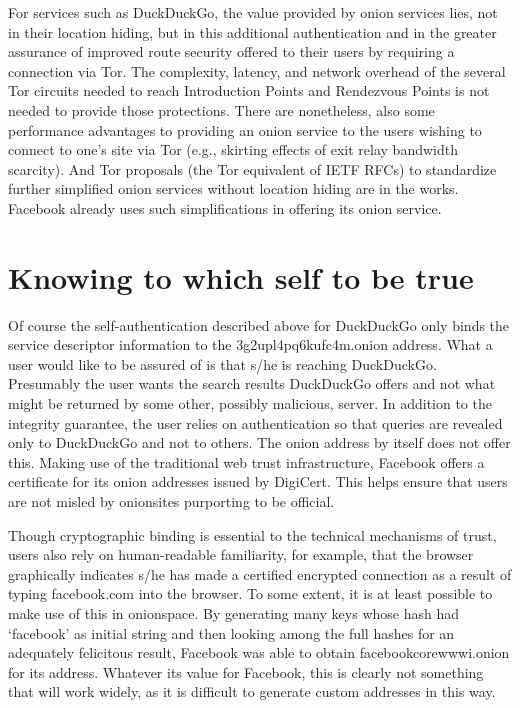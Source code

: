 \documentclass[10pt]{styles/IEEEtran}
\begin{document}
For services such as DuckDuckGo, the value provided by onion services
lies, not in their location hiding, but in this additional
authentication and in the greater assurance of improved route security
offered to their users by requiring a connection via Tor. The
complexity, latency, and network overhead of the several Tor circuits
needed to reach Introduction Points and Rendezvous Points is not
needed to provide those protections. There are nonetheless, also some
performance advantages to providing an onion service to the users
wishing to connect to one's site via Tor (e.g., skirting effects of
exit relay bandwidth scarcity). And Tor proposals (the Tor equivalent
of IETF RFCs) to standardize further simplified onion services without
location hiding are in the works. Facebook already uses such
simplifications in offering its onion service.

\section{Knowing to which self to be true}

Of course the self-authentication described above 
for DuckDuckGo only binds the
service descriptor information to the 3g2upl4pq6kufc4m.onion
address. What a user would like to be assured of is that s/he is
reaching DuckDuckGo. Presumably the user wants the search results
DuckDuckGo offers and not what might be returned by some other,
possibly malicious, server.  In addition to the integrity guarantee,
the user relies on authentication so that queries are revealed only to
DuckDuckGo and not to others. The onion address by itself does not
offer this. Making use of the traditional web trust infrastructure,
Facebook offers a certificate for its onion addresses
issued by DigiCert.  This helps ensure that users are not misled by
onionsites purporting to be official.

Though cryptographic binding is essential to the technical mechanisms
of trust, users also rely on human-readable familiarity, for example,
that the browser graphically indicates s/he has made a certified
encrypted connection as a result of typing facebook.com into the
browser.  To some extent, it is at least possible to make use of this
in onionspace. By generating many keys whose hash had `facebook' as
initial string and then looking among the full hashes for an
adequately felicitous result, Facebook was able to obtain
facebookcorewwwi.onion for its address. Whatever its value for
Facebook, this is clearly not something that will work widely, as it
is difficult to generate custom addresses in this way. 
\end{document}
